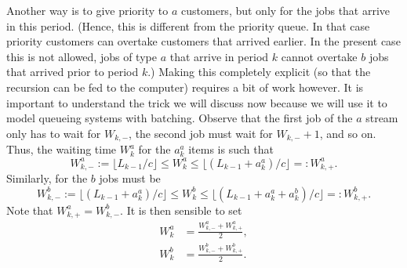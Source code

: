\begin{extra}
\begin{solution}
 Another way is to give priority to $a$ customers, but only for the jobs that arrive in this period.
 (Hence, this is different from the priority queue.
 In that case priority customers can overtake customers that arrived earlier.
 In the present case this is not allowed, jobs of type $a$ that arrive in period $k$ cannot overtake $b$ jobs that arrived prior to period $k$.)
 Making this completely explicit (so that the recursion can be fed to the computer) requires a bit of work however.
 It is important to understand the trick we will discuss now because we will use it to model queueing systems with batching.
 Observe that the first job of the $a$ stream only has to wait for $W_{k,-}$, the second job must wait for $W_{k,-}+1$, and so on.
 Thus, the waiting time $W_{k}^a$ for the $a_k^a$ items is such that
 \begin{equation*}
W_{k,-}^a:= \lfloor L_{k-1}/c \rfloor \leq W_{k}^a \leq \lfloor (L_{k-1}+a_k^a)/c \rfloor =: W_{k,+}^a.
 \end{equation*}
 Similarly, for the $b$ jobs must be
 \begin{equation*}
W_{k,-}^b := \lfloor (L_{k-1}+a_k^a)/c \rfloor \leq W_{k}^b \leq \lfloor (L_{k-1}+a_k^a+a_k^b)/c \rfloor =: W_{k,+}^b.
 \end{equation*}
Note that $W_{k,+}^a = W_{k,-}^b$. 
It is then sensible to set 
\begin{align*}
 W_{k}^a &= \frac{W_{k,-}^a + W_{k,+}^a}2, \\
 W_{k}^b &= \frac{W_{k,-}^b + W_{k,+}^b}2.
\end{align*}

\end{solution}
\end{extra}



